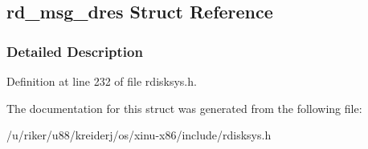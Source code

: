 \hypertarget{structrd__msg__dres}{}\subsection{rd\+\_\+msg\+\_\+dres Struct Reference}
\label{structrd__msg__dres}


\subsubsection{Detailed Description}


Definition at line 232 of file rdisksys.\+h.



The documentation for this struct was generated from the following file\+:\begin{DoxyCompactItemize}
\item 
/u/riker/u88/kreiderj/os/xinu-\/x86/include/rdisksys.\+h\end{DoxyCompactItemize}
